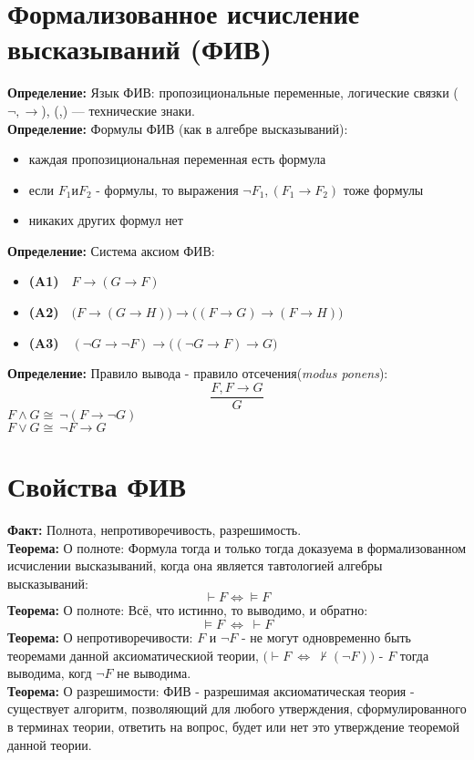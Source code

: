 \documentclass[../main.tex]{subfiles}
\begin{document}
\section{Формализованное исчисление высказываний (ФИВ)}
\textbf{Определение:
} Язык ФИВ: пропозициональные переменные, логические связки ($\lnot,\to$), (,) — технические знаки. \\
\textbf{
	Определение:
} Формулы ФИВ (как в алгебре высказываний):
\begin{itemize}
	\item каждая пропозициональная переменная есть формула
	\item если $F_1 и F_2$ - формулы, то выражения $\lnot F_1, (F_1\to F_2)$ тоже формулы 
	\item никаких других формул нет 
\end{itemize}
\textbf{
	Определение:
} Система аксиом ФИВ:
\begin{itemize}
	\item \textbf{(A1)}$\quad F\to (G\to F)$
	\item \textbf{(A2)}$\quad \bigl(F\to (G\to H)\bigr)\to \bigl((F\to G)\to (F\to H)\bigr)$
	\item \textbf{(A3)}$\quad (\lnot G\to\lnot F)\to \bigl((\lnot G\to F)\to G\bigr)$
\end{itemize}
\textbf{Определение:
} Правило вывода - правило отсечения(\textit{modus ponens}):\[\frac{F, F \to G}{G}\]
$F \land G \cong \ \lnot(F \to \lnot G)$\\
$F \lor G \cong \ \lnot F \to G$

\section{Свойства ФИВ}
\textbf{Факт:
}Полнота, непротиворечивость, разрешимость.\\
\textbf{Теорема:
} О полноте: Формула тогда и только тогда доказуема в формализованном исчислении высказываний, когда она является тавтологией алгебры высказываний:\[\vdash F\Leftrightarrow\vDash F\]
\textbf{Теорема:
} О полноте: Всё, что истинно, то выводимо, и обратно: 
\[\vDash F \ \Leftrightarrow \ \vdash F\]
\textbf{Теорема:
} О непротиворечивости: $F$ и $\lnot F$ - не могут одновременно быть теоремами данной аксиоматическиой теории, $\bigl(\vdash F \ \Leftrightarrow \ \nvdash (\lnot F)\bigr)$ -  $F$ тогда выводима, когд $\lnot F$ не выводима. \\
\textbf{Теорема:
} О разрешимости: ФИВ - разрешимая аксиоматическая теория - существует алгоритм, позволяющий для любого утверждения, сформулированного в терминах теории, ответить на вопрос, будет или нет это утверждение теоремой данной теории. \\
\end{document}
